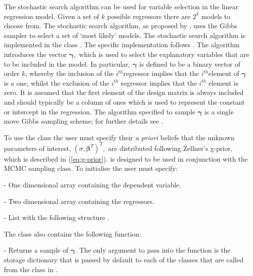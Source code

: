 \documentclass[article]{jss}
\begin{document}
The stochastic search algorithm can be used for variable selection in
the linear regression model. Given a set of $k$ possible regressors
there are $2^{k}$ models to choose from. The stochastic search
algorithm, as proposed by \citet{GeorgeMcCulloch1993}, uses the Gibbs
sampler to select a set of `most likely' models. The stochastic search
algorithm is implemented in the class . The
specific implementation follows \citet{MarinRobert2007}. The algorithm
introduces the vector $\bm{\gamma},$ which is used to select the
explanatory variables that are to be included in the model. In
particular, $\bm{\gamma}$ is defined to be a binary vector of order
$k$, whereby the inclusion of the $i^{th}$regressor implies that the
$i^{th}$element of $\bm{\gamma}$ is a one, whilst the exclusion of the
$i^{th}$ regressor implies that the $i^{th}$ element is zero.  It is
assumed that the first element of the design matrix is always included
and should typically be a column of ones which is used to represent
the constant or intercept in the regression. The algorithm specified
to sample $\bm{\gamma}$ is a single move Gibbs sampling scheme; for
further details see \citet{MarinRobert2007}.

To use the class the user must specify their
\emph{a priori} beliefs that the unknown parameters of interest,
$(\sigma,\bm{\beta}^{T})^{T},$ are distributed following Zellner's
g-prior, which is described in (\ref{eq:g-prior}).
is designed to be used in conjunction with the
MCMC sampling class. To initialise  the user
must specify:
\begin{description}
\item {} - One dimensional  array containing the
  dependent variable.
\item {} - Two dimensional  array containing the
  regressors.
\item {} - List with the following structure
  \code{{[}betaubar, g{]}}.
\end{description}
The class  also contains the following
function:
\begin{description}
\item {} - Returns a sample of $\bm{\gamma}.$
  The only argument to pass into the function  is
  the storage dictionary that is passed by default to each of the
  classes that are called from the class in .
\end{description}
\end{document}

